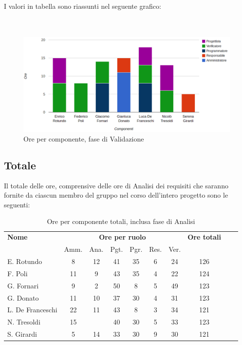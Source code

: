 I valori in tabella sono riassunti nel seguente grafico: \\ \\ \\

\begin{figure}[H]
\centering
\includegraphics[scale=0.35]{4-4.png}
\caption{Ore per componente, fase di Validazione\label{fig:nome}}
\end{figure}

\subsection{Totale}

Il totale delle ore, comprensive delle ore di Analisi dei requisiti che saranno fornite da ciascun membro del gruppo nel corso dell'intero progetto sono le seguenti:

\begin{table}[H]
\centering
\begin{tabular}{lccccccccc}
\toprule 
    \textbf{Nome}  & \multicolumn{6}{c}{\textbf{Ore per ruolo}} & \textbf{Ore totali}\\
     & Amm. & Ana. & Pgt. & Pgr. & Res. & Ver. \\
    \midrule
    E. Rotundo   	& 8 & 12& 41 & 35 & 6 & 24 & 126 \\
    F. Poli  		& 11	& 9 & 43 & 35 & 4 & 22 & 124 \\
    G. Fornari		& 9	& 2 & 50 & 8  & 5 & 49 & 123 \\
    G. Donato 		& 11	& 10& 37 & 30 & 4 & 31 & 123 \\
    L. De Franceschi 	& 22	& 11& 43 & 8  & 3 & 34 & 121 \\
    N. Tresoldi 		& 15	&   & 40 & 30 & 5 & 33 & 123 \\
    S. Girardi 		& 5	& 14& 33 & 30 & 9 & 30 & 121 \\
    
    \bottomrule
\end{tabular}
\caption{Ore per componente totali, inclusa fase di Analisi}
\end{table}

